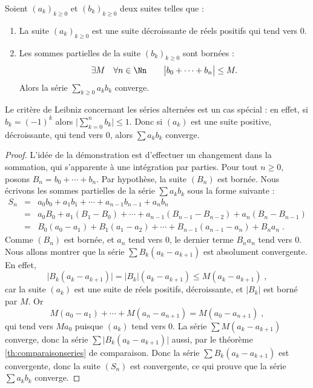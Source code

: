 \documentclass[class=report,crop=false]{standalone}
\begin{document}
\begin{theoreme}
\label{th:abelserie}
Soient $(a_k)_{k\ge0}$ et $(b_k)_{k\ge0}$ deux suites telles que :
\begin{enumerate}
\item La suite $(a_k)_{k\ge0}$ est une suite décroissante de
réels positifs qui tend vers $0$.
\item Les sommes partielles de la suite $(b_k)_{k\ge0}$ sont bornées :
$$\exists M\quad\forall n\in \Nn\qquad
\big|b_0+\cdots+b_n\big|\le M.$$
Alors la série $\sum_{k\ge0} a_kb_k$ converge.
\end{enumerate}
\end{theoreme}

Le critère de Leibniz concernant les séries alternées est un cas spécial :
en effet, si $b_k=(-1)^k$ alors $\big|\sum_{k=0}^n b_k\big|\le 1$.
Donc si $(a_k)$ est une suite positive, décroissante, qui tend vers $0$, alors 
$\sum a_k b_k$ converge.


\begin{proof}
L'idée de la démonstration est d'effectuer un changement dans la
sommation, qui s'apparente à une intégration par parties. Pour
tout $n\ge0$, posons $B_n=b_0+\cdots+b_n$. Par hypothèse, la suite
$(B_n)$ est bornée. Nous écrivons les sommes partielles de la
série $\sum a_k b_k$ sous la forme suivante :
$$
\begin{array}{rcl}
S_n & = & a_0b_0+a_1b_1+\cdots+a_{n-1}b_{n-1}+a_nb_n \\
&=& a_0B_0+a_1(B_1-B_0)+\cdots +a_{n-1}(B_{n-1}-B_{n-2}) + a_n(B_n-B_{n-1})\\
&=& B_0(a_0-a_1)+B_1(a_1-a_2)+\cdots+B_{n-1}(a_{n-1}-a_n)+B_na_n\;.
\end{array}
$$
Comme $(B_n)$ est bornée, et $a_n$ tend vers $0$, le dernier terme $B_na_n$
tend vers $0$. Nous allons montrer que la série $\sum B_k(a_k-a_{k+1})$ 
est absolument convergente. En effet,
$$
\big|B_k(a_k-a_{k+1})\big| = \big|B_k\big|(a_k-a_{k+1})\le M(a_k-a_{k+1})\;,
$$
car la suite $(a_k)$ est une suite de réels positifs,
décroissante, et $|B_k|$ est borné par $M$. Or
$$
M(a_0-a_1)+\cdots+M(a_n-a_{n+1}) = M(a_0-a_{n+1})\;,
$$
qui tend vers $Ma_0$ puisque $(a_k)$ tend vers $0$.
La série $\sum M(a_k-a_{k+1})$ converge, donc la série
$\sum\big|B_k(a_k-a_{k+1})\big|$ aussi, par le théorème 
\ref{th:comparaisonseries} de comparaison. Donc la série $\sum B_k(a_k-a_{k+1})$
est convergente, donc la suite $(S_n)$ est convergente, ce qui prouve que la série 
$\sum a_k b_k$ converge.
\end{proof}
\end{document}
